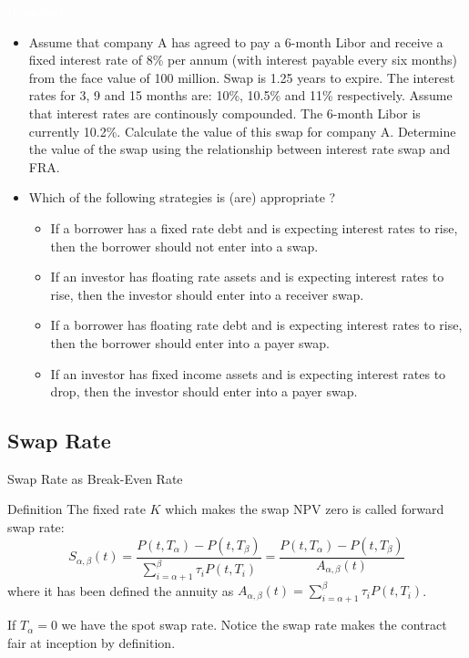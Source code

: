 \documentclass{beamer}
\begin{document}
\begin{homework}
	\begin{frame}{\textcolor{white}{Homework}}
		\begin{itemize}
			\item[white] Assume that company A has agreed to pay a 6-month Libor and receive a fixed interest rate of 8\% per annum (with interest payable every six months) from the face value of 100 million. Swap is 1.25 years to expire. The interest rates for 3, 9 and 15 months are: 10\%, 10.5\% and 11\% respectively. Assume that interest rates are continously compounded. The 6-month Libor is currently 10.2\%. Calculate the value of this swap for company A. Determine the value of the swap using the relationship between interest rate swap and FRA.
			\item[white] Which of the following strategies is (are) appropriate ?
			\small{
				\begin{itemize}
					\item[white] If a borrower has a fixed rate debt and is expecting interest rates to rise, then the borrower should not enter into a swap.
					\item[white] If an investor has floating rate assets and is expecting interest rates to rise, then the investor should enter into a receiver swap.
					\item[white] If a borrower has floating rate debt and is expecting interest rates to rise, then the borrower should enter into a payer swap.
					\item[white] If an investor has fixed income assets and is expecting interest rates to drop, then the investor should enter into a payer swap.
			\end{itemize}}
		\end{itemize}
	\end{frame}
\end{homework}

\subsection{Swap Rate}
\begin{frame}{Swap Rate as Break-Even Rate}
	\begin{block}{Definition}
		The fixed rate $K$ which makes the swap NPV zero is called \textcolor{maincolor}{forward swap rate}:
		\begin{equation}
			S_{\alpha,\beta}(t) = \frac{P(t, T_\alpha)-P(t,T_\beta)}{\sum_{i=\alpha+1}^{\beta}\tau_i P(t,T_i)} = \frac{P(t, T_\alpha)-P(t,T_\beta)}{A_{\alpha,\beta}(t)}
		\end{equation}
		where it has been defined the \textcolor{maincolor}{annuity} as  $A_{\alpha,\beta}(t) = \sum_{i=\alpha+1}^{\beta} \tau_i P(t, T_i)$.

		If $T_\alpha=0$ we have the \textcolor{maincolor}{spot swap rate}.
		Notice the swap rate makes the contract fair at inception by definition.
	\end{block}
\end{frame}
\end{document}
